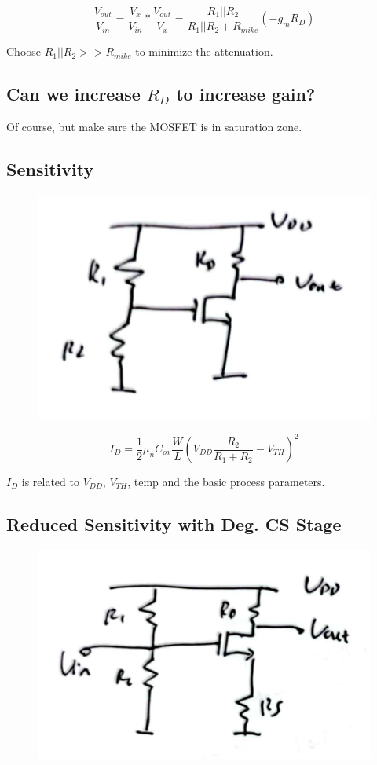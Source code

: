 \documentclass[fontset=windows]{article}
\begin{document}
$$\frac{V_{out}}{V_{in}}=\frac{V_x}{V_{in}}*\frac{V_{out}}{V_x}=\frac{R_1||R_2}{R_1||R_2+R_{mike}}(-g_mR_D)$$

Choose $R_1||R_2>>R_{mike}$ to minimize the attenuation. 

\subsection*{Can we increase $R_D$ to increase gain?}

Of course, but make sure the MOSFET is in saturation zone. 

\subsection*{Sensitivity}

\begin{figure}[htbp]
    \centering
    \includegraphics[scale=0.6]{6.jpg}
    \captionsetup{labelformat=empty}
    \caption{}
    \label{6}
\end{figure}

$$I_D=\frac{1}{2}\mu_nC_{ox}\frac{W}{L}(V_{DD}\frac{R_2}{R_1+R_2}-V_{TH})^2$$

$I_D$ is related to $V_{DD}$, $V_{TH}$, temp and the basic process parameters. 

\subsection*{Reduced Sensitivity with Deg. CS Stage}

\begin{figure}[htbp]
    \centering
    \includegraphics[scale=0.6]{7.jpg}
    \captionsetup{labelformat=empty}
    \caption{}
    \label{7}
\end{figure}
\end{document}
